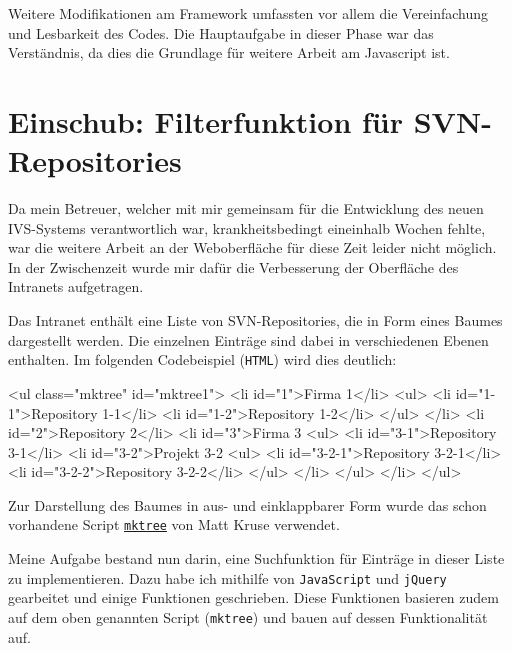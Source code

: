\documentclass[xcolor=dvipsnames,11pt,paper=a4paper]{report}
\begin{document}
Weitere Modifikationen am Framework umfassten vor allem die Vereinfachung und Lesbarkeit
des Codes. Die Hauptaufgabe in dieser Phase war das Verständnis, da dies die Grundlage
für weitere Arbeit am Javascript ist.



\section{Einschub: Filterfunktion für SVN-Repositories}
\label{sec:svn}

Da mein Betreuer, welcher mit mir gemeinsam für die Entwicklung des neuen IVS-Systems
verantwortlich war, krankheitsbedingt eineinhalb Wochen fehlte, war die weitere
Arbeit an der Weboberfläche für diese Zeit leider nicht möglich. In der Zwischenzeit
wurde mir dafür die Verbesserung der Oberfläche des Intranets aufgetragen.

Das Intranet enthält eine Liste von SVN-Repositories, die in Form eines Baumes dargestellt
werden. Die einzelnen Einträge sind dabei in verschiedenen Ebenen enthalten. Im
folgenden Codebeispiel (\texttt{HTML}) wird dies deutlich:

\begin{code}[language=html, caption={Beispielcode zu den SVN-Repositories im Intranet}, label={lst:svn-html-beispiel}]
<ul class="mktree" id="mktree1">
	<li id="1">Firma 1</li>
		<ul>
			<li id="1-1">Repository 1-1</li>
			<li id="1-2">Repository 1-2</li>
		</ul>
	</li>
	<li id="2">Repository 2</li>
	<li id="3">Firma 3
		<ul>
			<li id="3-1">Repository 3-1</li>
			<li id="3-2">Projekt 3-2
				<ul>
					<li id="3-2-1">Repository 3-2-1</li>
					<li id="3-2-2">Repository 3-2-2</li>
				</ul>
			</li>
		</ul>
	</li>
</ul>
\end{code}

Zur Darstellung des Baumes in aus- und einklappbarer Form wurde das schon vorhandene
Script \href{http://www.mattkruse.com/javascript/mktree}{\texttt{mktree}} von
Matt Kruse verwendet.

Meine Aufgabe bestand nun darin, eine Suchfunktion für Einträge in dieser Liste
zu implementieren. Dazu habe ich mithilfe von \texttt{JavaScript} und \texttt{jQuery}
gearbeitet und einige Funktionen geschrieben. Diese Funktionen basieren zudem auf
dem oben genannten Script (\texttt{mktree}) und bauen auf dessen Funktionalität
auf.
\end{document}
